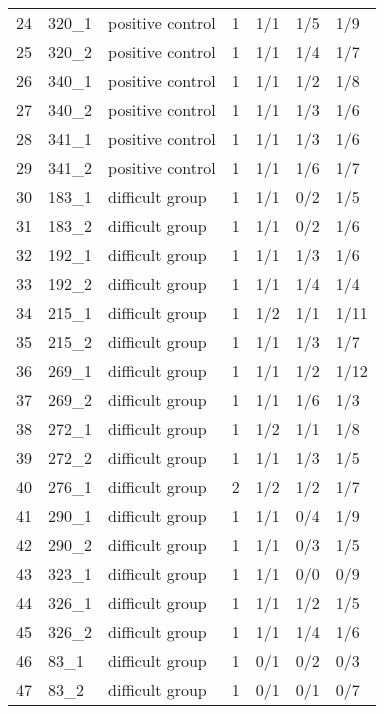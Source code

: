 \begin{table}[ht]
\begin{tabular}{rllrlll}
  24 & 320\_1 & positive control &   1 & 1/1 & 1/5 & 1/9 \\ 
  25 & 320\_2 & positive control &   1 & 1/1 & 1/4 & 1/7 \\ 
  26 & 340\_1 & positive control &   1 & 1/1 & 1/2 & 1/8 \\ 
  27 & 340\_2 & positive control &   1 & 1/1 & 1/3 & 1/6 \\ 
  28 & 341\_1 & positive control &   1 & 1/1 & 1/3 & 1/6 \\ 
  29 & 341\_2 & positive control &   1 & 1/1 & 1/6 & 1/7 \\ 
  30 & 183\_1 & difficult group &   1 & 1/1 & 0/2 & 1/5 \\ 
  31 & 183\_2 & difficult group &   1 & 1/1 & 0/2 & 1/6 \\ 
  32 & 192\_1 & difficult group &   1 & 1/1 & 1/3 & 1/6 \\ 
  33 & 192\_2 & difficult group &   1 & 1/1 & 1/4 & 1/4 \\ 
  34 & 215\_1 & difficult group &   1 & 1/2 & 1/1 & 1/11 \\ 
  35 & 215\_2 & difficult group &   1 & 1/1 & 1/3 & 1/7 \\ 
  36 & 269\_1 & difficult group &   1 & 1/1 & 1/2 & 1/12 \\ 
  37 & 269\_2 & difficult group &   1 & 1/1 & 1/6 & 1/3 \\ 
  38 & 272\_1 & difficult group &   1 & 1/2 & 1/1 & 1/8 \\ 
  39 & 272\_2 & difficult group &   1 & 1/1 & 1/3 & 1/5 \\ 
  40 & 276\_1 & difficult group &   2 & 1/2 & 1/2 & 1/7 \\ 
  41 & 290\_1 & difficult group &   1 & 1/1 & 0/4 & 1/9 \\ 
  42 & 290\_2 & difficult group &   1 & 1/1 & 0/3 & 1/5 \\ 
  43 & 323\_1 & difficult group &   1 & 1/1 & 0/0 & 0/9 \\ 
  44 & 326\_1 & difficult group &   1 & 1/1 & 1/2 & 1/5 \\ 
  45 & 326\_2 & difficult group &   1 & 1/1 & 1/4 & 1/6 \\ 
  46 & 83\_1 & difficult group &   1 & 0/1 & 0/2 & 0/3 \\ 
  47 & 83\_2 & difficult group &   1 & 0/1 & 0/1 & 0/7 \\ 
   \hline
\end{tabular}
\end{table}

